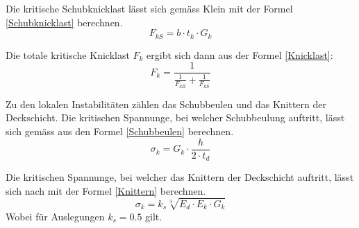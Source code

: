     Die kritische Schubknicklast lässt sich gemäss Klein \cite{klein} mit der Formel \ref{Schubknicklast} berechnen.
    \begin{equation}
      \label{Schubknicklast}
      F_{kS} = b \cdot t_k \cdot G_k
    \end{equation}

    Die totale kritische Knicklast \(F_k\) ergibt sich dann aus der Formel \ref{Knicklast}:
    \begin{equation}
      \label{Knicklast}
      F_k=\frac{1}{\frac{1}{F_{kB}}+\frac{1}{F_{kS}}}
    \end{equation}

    Zu den lokalen Instabilitäten zählen das Schubbeulen und das Knittern der Deckschicht. Die kritischen Spannunge, bei welcher Schubbeulung auftritt, lässt sich gemäss \cite{ETH} aus den Formel \ref{Schubbeulen} berechnen.
    \begin{equation}
      \label{Schubbeulen}
      \sigma_k = G_k \cdot \frac{h}{2 \cdot t_d}
    \end{equation}

    Die kritischen Spannunge, bei welcher das Knittern der Deckschicht auftritt, lässt sich nach \cite{ETH} mit der Formel \ref{Knittern} berechnen.
    \begin{equation}
      \label{Knittern}
      \sigma_k = k_s\sqrt[3]{E_d \cdot E_k \cdot G_k}
    \end{equation}
    Wobei für Auslegungen \(k_s = 0.5\) gilt.


